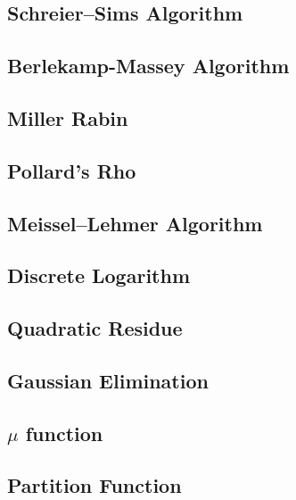 \documentclass[a4paper,10pt,twocolumn,oneside]{article}
\begin{document}
\subsection{Schreier–Sims Algorithm}

\subsection{Berlekamp-Massey Algorithm}

% 
\subsection{Miller Rabin}

\subsection{Pollard's Rho}

\subsection{Meissel–Lehmer Algorithm}

\subsection{Discrete Logarithm}

\subsection{Quadratic Residue}

\subsection{Gaussian Elimination}

% 
\subsection{$\mu$ function}

\subsection{Partition Function}

\end{document}
